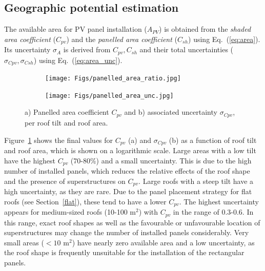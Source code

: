 
\subsection{Geographic potential estimation}
\label{solar_geo}


The available area for PV panel installation ($A_{PV}$) is obtained from the \textit{shaded area coefficient} ($C_{\mathit{pv}}$) and the \textit{panelled area coefficient} ($C_{sh}$) using Eq.~(\ref{eq:area}). Its uncertainty $\sigma_{A}$ is derived from $C_{\mathit{pv}}, C_{sh}$ and their total uncertainties ($\sigma_{\mathit{Cpv}}, \sigma_{\mathit{Csh}}$) using Eq.~(\ref{eq:area_unc}).

\begin{figure}[tb]
\centering
\begin{subfigure}{.49\textwidth}
  \centering
  \texttt{[image: Figs/panelled\_area\_ratio.jpg]}
  \subcaption{}
\end{subfigure}
\begin{subfigure}{.49\textwidth}
  \centering
  \texttt{[image: Figs/panelled\_area\_unc.jpg]}  
  \subcaption{}
\end{subfigure}
\caption{a) Panelled area coefficient $C_{\mathit{pv}}$ and b) associated uncertainty $\sigma_{\mathit{Cpv}}$, per roof tilt and roof area.}
\label{fig:C_pv}
\end{figure}

Figure~\ref{fig:C_pv} shows the final values for $C_{\mathit{pv}}$ (a) and $\sigma_{\mathit{Cpv}}$ (b) as a function of roof tilt and roof area, which is shown on a logarithmic scale. 
Large areas with a low tilt have the highest $C_{\mathit{pv}}$ (70-80\%) and a small uncertainty.
This is due to the high number of installed panels, which reduces the relative effects of the roof shape and the presence of superstructures on $C_{\mathit{pv}}$. Large roofs with a steep tilt have a high uncertainty, as they are rare.
Due to the panel placement strategy for flat roofs (see Section~\ref{flat}), these tend to have a lower $C_{\mathit{pv}}$. 
The highest uncertainty appears for medium-sized roofs (10-100 m$^2$) with $C_{\mathit{pv}}$ in the range of 0.3-0.6. In this range, exact roof shapes as well as the favourable or unfavourable location of superstructures may change the number of installed panels considerably.
Very small areas ($< 10$ m$^2$) have nearly zero available area and a low uncertainty, as the roof shape is frequently unsuitable for the installation of the rectangular panels.

